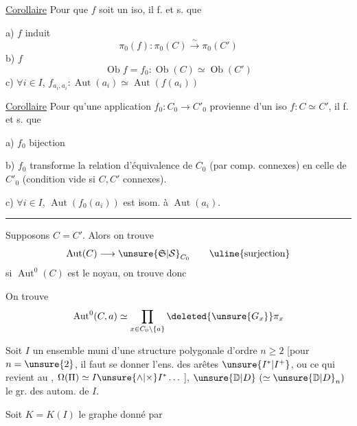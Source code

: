\uline{Corollaire} Pour que $f$ soit un iso, il f. et s. que

a) $f$ induit
\[
\pi_0(f):\pi_0(C)\xrightarrow{\sim}\pi_0(C')
\]
b) $f$ 
\[
\operatorname{Ob}f=f_0:\operatorname{Ob}(C)\simeq\operatorname{Ob}(C')
\]
c) $\forall i\in I$, $f_{a_i,a_i}:\operatorname{Aut}(a_i)\simeq\operatorname{Aut}(f(a_i))$


\uline{Corollaire} Pour qu'une application $f_0:C_0\longrightarrow C'_0$ provienne d'un iso $f:C\simeq C'$, il f. et s. que

a) $f_0$  bijection

b) $f_0$ transforme la relation d'équivalence de $C_0$ (par comp. connexes) en celle de $C'_0$ (condition vide si $C,C'$ connexes).

c) $\forall i\in I$, $\operatorname{Aut}(f_0(a_i))$ est isom. à $\operatorname{Aut}(a_i)$.

\par\hfill\rule{1.5cm}{.4pt}\hfill\par
{} Supposons $C=C'$. Alors on trouve
\[
\operatorname{Aut}(C)\longrightarrow\unsure{\mathfrak S|\mathcal S}_{C_0}\qquad\uline{\text{surjection}}
\]
si $\operatorname{Aut}^0(C)$ est le noyau, on trouve donc

On trouve
\[
\operatorname{Aut}^0(C,a)\simeq\prod_{x\in C_0\setminus\{a\}}\deleted{\unsure{G_x}}\pi_x
\]

Soit $I$ un ensemble muni d'une structure polygonale d'ordre $n\geq2$  [pour $n=\unsure{2}$, il faut se donner l'ens.  des arêtes $\unsure{I^*|I^+}$,  ou ce qui revient au , $\Omega(\Pi)\simeq I\unsure{\wedge|\times}I^*\ldots$ ], $\unsure{\mathbb D|D}\ (\simeq\unsure{\mathbb D|D}_n)$ le gr. des autom. de $I$.

Soit $K=K(I)$ le graphe donné par

